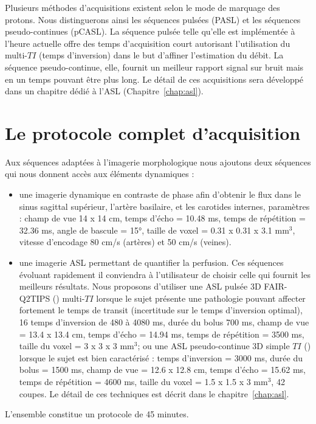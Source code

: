 Plusieurs méthodes d’acquisitions existent selon le mode de marquage des protons. Nous
distinguerons ainsi les séquences pulsées (PASL) et les séquences pseudo-continues (pCASL). La
séquence pulsée telle qu’elle est implémentée à l’heure actuelle offre des temps d’acquisition court
autorisant l’utilisation du multi-$TI$ (temps d’inversion) dans le but d’affiner l’estimation du débit. La
séquence pseudo-continue, elle, fournit un meilleur rapport signal sur bruit mais en un temps pouvant
être plus long. Le détail de ces acquisitions sera développé dans un chapitre dédié à l’ASL (Chapitre~\ref{chap:asl}).
\section{Le protocole complet d'acquisition}
\label{sec:protocole}
Aux séquences adaptées à l’imagerie morphologique nous ajoutons deux séquences qui nous
donnent accès aux éléments dynamiques :
\begin{itemize}
\item une imagerie dynamique en contraste de phase afin d’obtenir le flux dans le sinus sagittal
supérieur, l’artère basilaire, et les carotides internes, paramètres : champ de vue 14 x 14
cm, temps d’écho = 10.48 ms, temps de répétition = 32.36 ms, angle de bascule = 15°,
taille de voxel = 0.31 x 0.31 x 3.1 mm$^3$, vitesse d’encodage 80 cm/s (artères) et 50 cm/s
(veines).
\item une imagerie ASL permettant de quantifier la perfusion. Ces séquences évoluant
rapidement il conviendra à l’utilisateur de choisir celle qui fournit les meilleurs résultats.
Nous proposons d’utiliser une ASL pulsée 3D FAIR-Q2TIPS (\cite{Gunther2005}) multi-$TI$ lorsque le sujet
présente une pathologie pouvant affecter fortement le temps de transit (incertitude sur le
temps d’inversion optimal), 16 temps d’inversion de 480 à 4080 ms, durée du bolus 700
ms, champ de vue = 13.4 x 13.4 cm, temps d’écho = 14.94 ms, temps de répétition = 3500
ms, taille du voxel = 3 x 3 x 3 mm$^3$; ou une ASL pseudo-continue 3D simple $TI$ (\cite{Wu2007}) lorsque
le sujet est bien caractérisé : temps d’inversion = 3000 ms, durée du bolus = 1500 ms,
champ de vue = 12.6 x 12.8 cm, temps d’écho = 15.62 ms, temps de répétition = 4600 ms,
taille du voxel = 1.5 x 1.5 x 3 mm$^3$, 42 coupes. Le détail de ces techniques est décrit dans le
chapitre~\ref{chap:asl}.
\end{itemize}
L’ensemble constitue un protocole de 45 minutes.




	
{}
